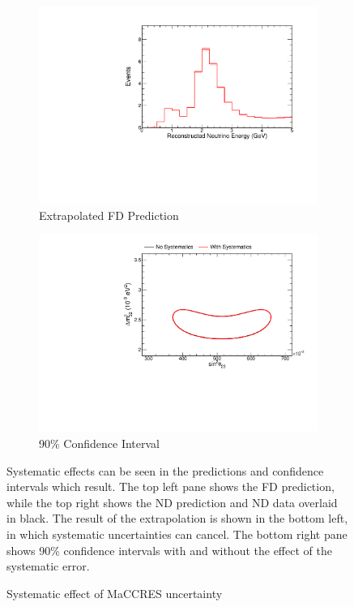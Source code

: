 {\begin{figure}
\begin{center}
\begin{subfigure}[c]{0.49\textwidth}
\includegraphics[width=\textwidth]{figures/systs/prediction/fd_extrap_prediction_MaCCRES.pdf}
\caption*{Extrapolated FD Prediction}
\end{subfigure}
\begin{subfigure}[c]{0.49\textwidth}
\includegraphics[width=\textwidth]{figures/systs/prediction/fd_extrap_contour_MaCCRES.pdf}
\caption*{90\% Confidence Interval}
\end{subfigure}
\end{center}
\caption{Systematic effect of MaCCRES uncertainty}{
Systematic effects can be seen in the predictions and confidence intervals
which result.
The top left pane shows the FD prediction, while the top right shows the
ND prediction and ND data overlaid in black.
The result of the extrapolation is shown in the bottom left, in which
systematic uncertainties can cancel.
The bottom right pane shows 90\% confidence intervals with and without
the effect of the systematic error.}
\label{syst_fig_MaCCRES}


\end{figure}}
